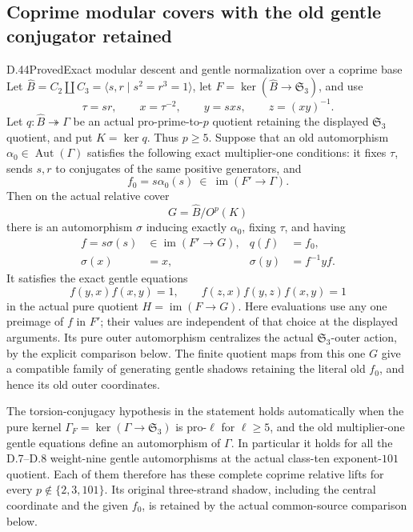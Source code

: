 \subsection{Coprime modular covers with the old gentle conjugator retained}

\begin{statement}{D.44}{Proved}{Exact modular descent and gentle normalization over a coprime base}
Let
\(\widehat B=C_2\amalg C_3=\langle s,r\mid s^2=r^3=1\rangle\),
let
\(F=\ker(\widehat B\to\mathfrak S_3)\),
and use
\[
 \tau=sr,\qquad x=\tau^{-2},\qquad y=sxs,\qquad z=(xy)^{-1}.
 \tag{D.44.1}
\]
Let \(q:\widehat B\twoheadrightarrow\Gamma\) be an actual
pro-prime-to-\(p\) quotient retaining the displayed
\(\mathfrak S_3\) quotient, and put \(K=\ker q\).
Thus \(p\geq5\).
Suppose that an old automorphism
\(\alpha_0\in\operatorname{Aut}(\Gamma)\) satisfies
the following exact multiplier-one conditions:
it fixes \(\tau\), sends \(s,r\) to conjugates of
the same positive generators, and
\[
             f_0=s\alpha_0(s)
                   \ \in\ \operatorname{im}(F'\to\Gamma).
 \tag{D.44.2}
\]
Then on the actual relative cover
\[
                    G=\widehat B/O^p(K)
 \tag{D.44.3}
\]
there is an automorphism \(\sigma\) inducing exactly
\(\alpha_0\), fixing \(\tau\), and having
\[
 \begin{split}
 f=s\sigma(s)&\in\operatorname{im}(F'\to G),&
 q(f)&=f_0,\\
 \sigma(x)&=x,&
 \sigma(y)&=f^{-1}yf.
 \end{split}
 \tag{D.44.4}
\]
It satisfies the exact gentle equations
\[
       f(y,x)f(x,y)=1,\qquad
       f(z,x)f(y,z)f(x,y)=1
 \tag{D.44.5}
\]
in the actual pure quotient \(H=\operatorname{im}(F\to G)\).
Here evaluations use any one preimage of \(f\) in \(F'\);
their values are independent of that choice at the displayed
arguments.
Its pure outer automorphism centralizes the actual
\(\mathfrak S_3\)-outer action, by the explicit
comparison below.
The finite quotient maps from this one \(G\) give a
compatible family of generating gentle shadows retaining
the literal old \(f_0\), and hence its old outer coordinates.

The torsion-conjugacy hypothesis in the statement holds
automatically when the pure kernel
\(\Gamma_F=\ker(\Gamma\to\mathfrak S_3)\)
is pro-\(\ell\) for \(\ell\geq5\), and the old
multiplier-one gentle equations define an automorphism
of \(\Gamma\).
In particular it holds for all the D.7--D.8
weight-nine gentle automorphisms at the actual
class-ten exponent-\(101\) quotient.
Each of them therefore has these complete coprime
relative lifts for every \(p\notin\{2,3,101\}\).
Its original three-strand shadow, including the
central coordinate and the given \(f_0\), is retained
by the actual common-source comparison below.
\end{statement}

